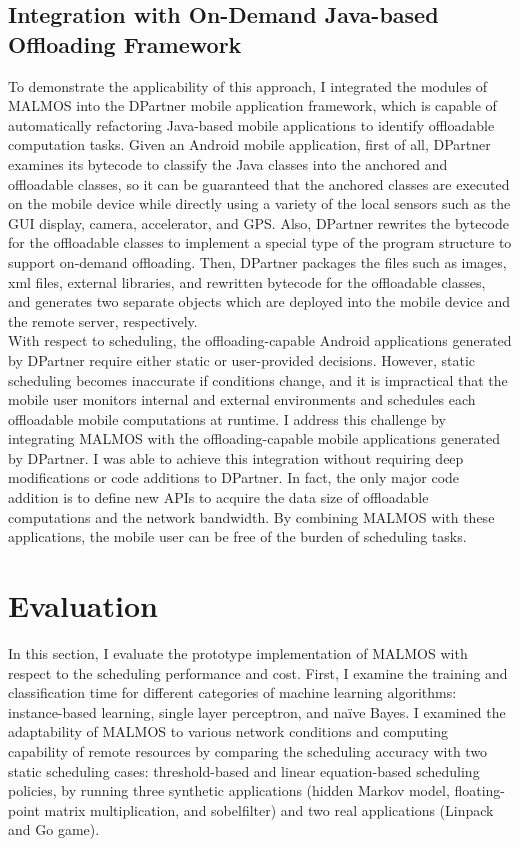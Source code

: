 {{\subsection{Integration with On-Demand Java-based Offloading Framework}
\label{online:integration}
To demonstrate the applicability of this approach, I integrated the
modules of MALMOS into the DPartner mobile application framework, which
is capable of automatically refactoring Java-based mobile applications
to identify offloadable computation tasks.
%
Given an Android mobile application, first of all, DPartner examines its
bytecode to classify the Java classes into the anchored and offloadable
classes, so it can be guaranteed that the anchored classes are executed
on the mobile device while directly using a variety of the local sensors
such as the GUI display, camera, accelerator, and GPS.
%
Also, DPartner rewrites the bytecode for the offloadable classes to
implement a special type of the program structure to support on-demand
offloading.
%
Then, DPartner packages the files such as images, xml files, external
libraries, and rewritten bytecode for the offloadable classes, and
generates two separate objects which are deployed into the mobile device
and the remote server, respectively.\\
%
With respect to scheduling, the offloading-capable
Android applications generated by DPartner require either static or
user-provided decisions. 
%
However, static scheduling becomes inaccurate if conditions change, and
it is impractical that the mobile user monitors internal and
external environments and schedules each offloadable mobile computations
at runtime.
%
I address this challenge by integrating MALMOS with the
offloading-capable mobile applications generated by DPartner. 
%
I was able to achieve this integration without requiring deep
modifications or code additions to DPartner.
%
In fact, the only major code addition is to define new APIs to acquire
the data size of offloadable computations and the network bandwidth. 
%
By combining MALMOS with these applications, the mobile user can be free
of the burden of scheduling tasks.
%

\section{Evaluation}
\label{online:evaluation}
In this section, I evaluate the prototype implementation of MALMOS with
respect to the scheduling performance and cost.
%
First, I examine the training and classification time for different
categories of machine learning algorithms: instance-based learning,
single layer perceptron, and na\"{i}ve Bayes.
%
I examined the adaptability of MALMOS to various network conditions and
computing capability of remote resources by comparing the scheduling
accuracy with two static scheduling cases: threshold-based and linear
equation-based scheduling policies, by running three synthetic
applications (hidden Markov model, floating-point matrix multiplication, and
sobelfilter) and two real applications (Linpack and Go game).
%
}}

